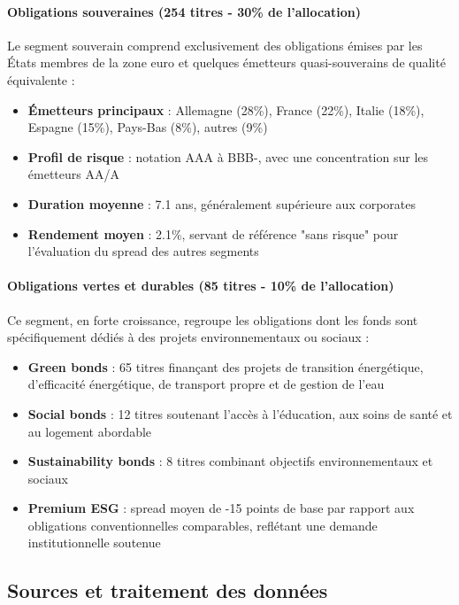 \paragraph{Obligations souveraines (254 titres - 30\% de l'allocation)}
Le segment souverain comprend exclusivement des obligations émises par les États membres de la zone euro et quelques émetteurs quasi-souverains de qualité équivalente :
\begin{itemize}
    \item \textbf{Émetteurs principaux} : Allemagne (28\%), France (22\%), Italie (18\%), Espagne (15\%), Pays-Bas (8\%), autres (9\%)
    \item \textbf{Profil de risque} : notation AAA à BBB-, avec une concentration sur les émetteurs AA/A
    \item \textbf{Duration moyenne} : 7.1 ans, généralement supérieure aux corporates
    \item \textbf{Rendement moyen} : 2.1\%, servant de référence "sans risque" pour l'évaluation du spread des autres segments
\end{itemize}

\paragraph{Obligations vertes et durables (85 titres - 10\% de l'allocation)}
Ce segment, en forte croissance, regroupe les obligations dont les fonds sont spécifiquement dédiés à des projets environnementaux ou sociaux :
\begin{itemize}
    \item \textbf{Green bonds} : 65 titres finançant des projets de transition énergétique, d'efficacité énergétique, de transport propre et de gestion de l'eau
    \item \textbf{Social bonds} : 12 titres soutenant l'accès à l'éducation, aux soins de santé et au logement abordable
    \item \textbf{Sustainability bonds} : 8 titres combinant objectifs environnementaux et sociaux
    \item \textbf{Premium ESG} : spread moyen de -15 points de base par rapport aux obligations conventionnelles comparables, reflétant une demande institutionnelle soutenue
\end{itemize}

\subsection{Sources et traitement des données}

